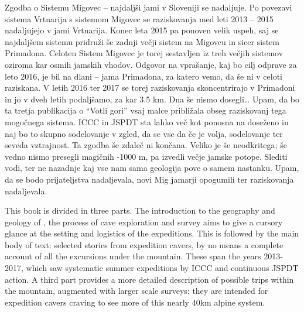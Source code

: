Zgodba o Sistemu Migovec – najdaljši jami v Sloveniji se nadaljuje. Po povezavi sistema Vrtnarija s sistemom Migovec se raziskovanja med leti 2013 – 2015 nadaljujejo v jami Vrtnarija. Konec leta 2015 pa ponoven velik uspeh, saj se najdaljšem sistemu pridruži še zadnji večji sistem na Migovcu in sicer sistem Primadona. Celoten Sistem Migovec je torej sestavljen iz treh večjih sistemov oziroma kar osmih jamskih vhodov. Odgovor na vprašanje, kaj bo cilj odprave za leto 2016, je bil na dlani – jama Primadona, za katero vemo, da še ni v celoti raziskana. V letih 2016 ter 2017 se torej  raziskovanja skoncentrirajo v Primadoni in jo v dveh letih podaljšamo, za kar 3.5 km. Dna še nismo dosegli…
Upam, da bo ta tretja publikacija o “Votli gori” vsaj malce približala obseg raziskovanj tega mogočnega sistema. 
ICCC in JSPDT sta lahko več kot ponosna na doseženo in naj bo to skupno sodelovanje v zgled, da se vse da če je volja, sodelovanje ter seveda vztrajnost. 
Ta zgodba še zdaleč ni končana. Veliko je še neodkritega; še vedno nismo presegli magičnih -1000 m, pa izvedli večje jamske potope. Slediti vodi, ter ne nazadnje kaj vse nam sama geologija pove o samem nastanku.  
Upam, da se bodo prijateljstva nadaljevala, novi Mig jamarji opogumili ter raziskovanja nadaljevala. 


\mydelimiter

This book is divided in three parts. The introduction to the geography and geology of , the process of cave exploration and survey aims to give a cursory glance at the setting and logistics of the expeditions. This is followed by the main body of text: selected stories from expedition cavers, by no means a complete account of all the excursions under the mountain. These span the years 2013-2017, which saw systematic summer expeditions by ICCC and continuous JSPDT action. A third part provides a more detailed description of possible trips within the mountain, augmented with larger scale surveys: they are intended for expedition cavers craving to see more of this nearly 40km alpine system. 
